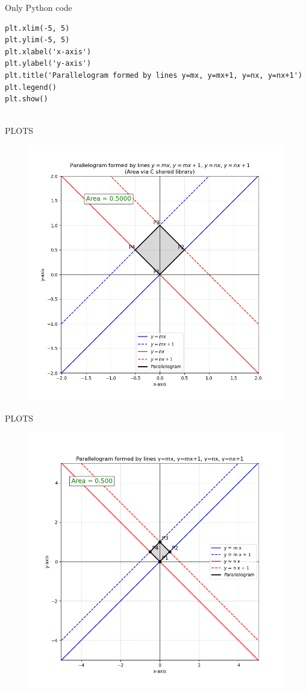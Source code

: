 \documentclass{beamer}
\begin{document}
\begin{frame}[fragile]{Only Python code}
\begin{lstlisting}
plt.xlim(-5, 5)
plt.ylim(-5, 5)
plt.xlabel('x-axis')
plt.ylabel('y-axis')
plt.title('Parallelogram formed by lines y=mx, y=mx+1, y=nx, y=nx+1')
plt.legend()
plt.show()


  \end{lstlisting}
\end{frame}
\begin{frame}{PLOTS}
    \begin{figure}
        \centering
        \includegraphics[width=0.9\columnwidth]{figs/Figure_81.png}
        \caption{}
        \label{fig:placeholder}
    \end{figure}
\end{frame}
\begin{frame}{PLOTS}
    \begin{figure}
        \centering
        \includegraphics[width=0.9\columnwidth]{figs/fig82.png}
        \caption{}
        \label{fig:placeholder}
    \end{figure}
\end{frame}
\end{document}
